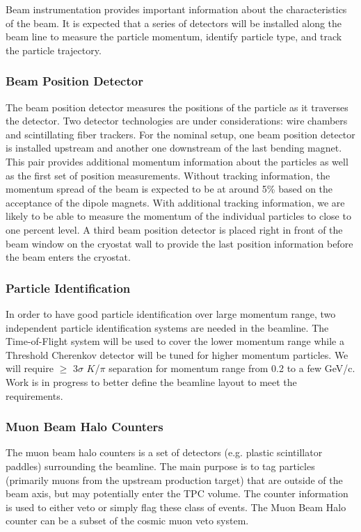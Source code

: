 \label{beaminstrument}
Beam instrumentation provides important information about the characteristics of the beam. It is expected that a series of detectors will be installed along the beam line to measure the particle momentum, identify particle type, and track the particle trajectory.

\subsubsection{Beam Position Detector}
The beam position detector measures the positions of the particle as it traverses the detector. Two detector technologies are under considerations: wire chambers and scintillating fiber trackers. For the nominal setup, one beam position detector is installed upstream and another one downstream of the last bending magnet. This pair provides additional momentum information about the particles as well as the first set of position measurements. Without tracking information, the momentum spread of the beam is expected to be at around 5\% based on the acceptance of the dipole magnets. With additional tracking information, we are likely to be able to measure the momentum of the individual particles to close to one percent level. A third beam position detector is placed right in front of the beam window on the cryostat wall to provide the last position information before the beam enters the cryostat.

\subsubsection{Particle Identification}
In order to have good particle identification over large momentum range, two independent particle identification systems are needed in the beamline. The Time-of-Flight system will be used to cover the lower momentum range while a Threshold Cherenkov detector will be tuned for higher momentum particles. We will require $\geq$ 3$\sigma$ $K$/$\pi$ separation for momentum range from 0.2 to a few GeV/c. Work is in progress to better define the beamline layout to meet the requirements.

\subsubsection{Muon Beam Halo Counters}
The muon beam halo counters is a set of detectors (e.g. plastic scintillator paddles) surrounding the beamline. The main purpose is to tag particles (primarily muons from the upstream production target) that are outside of the beam axis, but may potentially enter the TPC volume. The counter information is used to either veto or simply flag these class of events. The Muon Beam Halo counter can be a subset of the cosmic muon veto system. 

